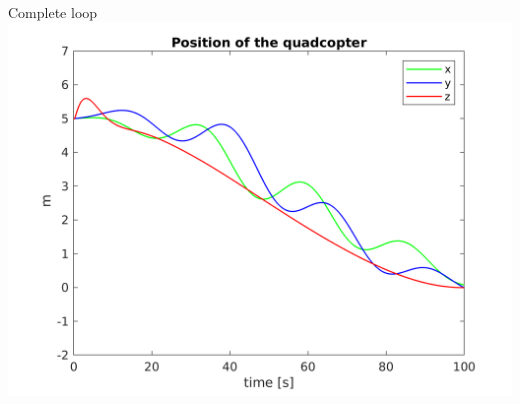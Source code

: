 \begin{frame}[fragile]{Complete loop}
  \includegraphics[width=\textwidth]{../report/Images/Position}
\end{frame}

